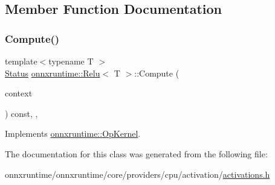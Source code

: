 \subsection{Member Function Documentation}
\mbox{\label{classonnxruntime_1_1Relu_a1e77cc4de86c018e0bf4fcdcaa92ab21}} 
\subsubsection{\texorpdfstring{Compute()}{Compute()}}
{\footnotesize\ttfamily template$<$typename T $>$ \\
\mbox{\hyperlink{classonnxruntime_1_1common_1_1Status}{Status}} \mbox{\hyperlink{classonnxruntime_1_1Relu}{onnxruntime\+::\+Relu}}$<$ T $>$\+::Compute (\begin{DoxyParamCaption}\item[{\mbox{\hyperlink{classonnxruntime_1_1OpKernelContext}{Op\+Kernel\+Context}} $\ast$}]{context }\end{DoxyParamCaption}) const\hspace{0.3cm}{\ttfamily [inline]}, {\ttfamily [override]}, {\ttfamily [virtual]}}



Implements \mbox{\hyperlink{classonnxruntime_1_1OpKernel_a9eca8656a78b1b3ab9d3351a12798650}{onnxruntime\+::\+Op\+Kernel}}.



The documentation for this class was generated from the following file\+:\begin{DoxyCompactItemize}
\item 
onnxruntime/onnxruntime/core/providers/cpu/activation/\mbox{\hyperlink{cpu_2activation_2activations_8h}{activations.\+h}}\end{DoxyCompactItemize}
